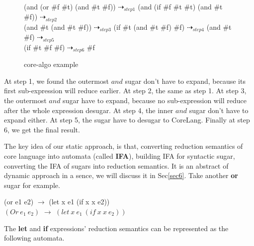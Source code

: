 \begin{figure}[ht]
\parbox[t]{\textwidth}{
\begin{Codes}
    (and (or \#f \#t) (and \#t \#f)) $\dashrightarrow_{step1}$
(and (if \#f \#t \#t) (and \#t \#f)) $\dashrightarrow_{step2}$\\
(and \#t (and \#t \#f)) $\dashrightarrow_{step3}$
(if \#t (and \#t \#f) \#f) $\dashrightarrow_{step4}$
(and \#t \#f) $\dashrightarrow_{step5}$\\
(if \#t \#f \#f) $\dashrightarrow_{step6}$
\#f
\end{Codes}
		}
\caption{core-algo example}
\label{fig:core-algo}
\end{figure}

At step 1, we found the outermost $and$ sugar don't have to expand, because its first sub-expression will reduce earlier. At step 2, the same as step 1. At step 3, the outermost $and$ sugar have to expand, because no sub-expression will reduce after the whole expression desugar. At step 4, the inner $and$ sugar don't have to expand either. At step 5, the sugar have to desugar to CoreLang. Finally at step 6, we get the final result.

The key idea of our static approach, is that, converting reduction semantics of core language into automata (called {\bfseries IFA}), building IFA for syntactic sugar, converting the IFA of sugars into reduction semantics. It is an abstract of dynamic approach in a sence, we will discuss it in Sec\ref{sec6}. Take another {\bfseries or} sugar for example.
\begin{flushleft}
	(or e1 e2) $\rightarrow$ (let x e1 (if x x e2))\\
	$(Or~e_1~e_2)$ $\rightarrow$ $(let~x~e_1~(if~x~x~e_2))$
\end{flushleft}  
The {\bfseries let} and {\bfseries if} expressions' reduction semantics can be represented as  the following automata.



